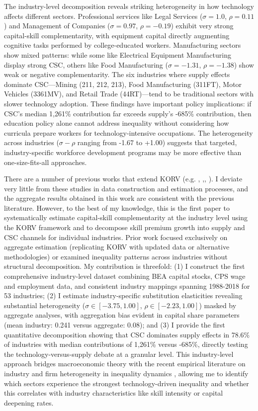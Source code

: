 \documentclass[12pt]{article}
\begin{document}
The industry-level decomposition reveals striking heterogeneity in how technology affects different sectors. Professional services like Legal Services ($\sigma = 1.0$, $\rho = 0.11$) and Management of Companies ($\sigma = 0.97$, $\rho = -0.19$) exhibit very strong capital-skill complementarity, with equipment capital directly augmenting cognitive tasks performed by college-educated workers. Manufacturing sectors show mixed patterns: while some like Electrical Equipment Manufacturing display strong CSC, others like Food Manufacturing ($\sigma = -1.31$, $\rho = -1.38$) show weak or negative complementarity. The six industries where supply effects dominate CSC---Mining (211, 212, 213), Food Manufacturing (311FT), Motor Vehicles (3361MV), and Retail Trade (44RT)---tend to be traditional sectors with slower technology adoption. These findings have important policy implications: if CSC's median 1,261\% contribution far exceeds supply's -685\% contribution, then education policy alone cannot address inequality without considering how curricula prepare workers for technology-intensive occupations. The heterogeneity across industries ($\sigma - \rho$ ranging from -1.67 to +1.00) suggests that targeted, industry-specific workforce development programs may be more effective than one-size-fits-all approaches.

There are a number of previous works that extend KORV (e.g. \citet{polgreen2008capital}, \citet{maliar2020capital},\citet{ohanian2021revisiting}, \citet{castex2022decline}). I deviate very little from these studies in data construction and estimation processes, and the aggregate results obtained in this work are consistent with the previous literature. However, to the best of my knowledge, this is the first paper to systematically estimate capital-skill complementarity at the industry level using the KORV framework and to decompose skill premium growth into supply and CSC channels for individual industries. Prior work focused exclusively on aggregate estimation (replicating KORV with updated data or alternative methodologies) or examined inequality patterns across industries without structural decomposition. My contribution is threefold: (1) I construct the first comprehensive industry-level dataset combining BEA capital stocks, CPS wage and employment data, and consistent industry mappings spanning 1988-2018 for 53 industries; (2) I estimate industry-specific substitution elasticities revealing substantial heterogeneity ($\sigma \in [-3.75, 1.00]$, $\rho \in [-2.23, 1.00]$) masked by aggregate analyses, with aggregation bias evident in capital share parameters (mean industry: 0.241 versus aggregate: 0.08); and (3) I provide the first quantitative decomposition showing that CSC dominates supply effects in 78.6\% of industries with median contributions of 1,261\% versus -685\%, directly testing the technology-versus-supply debate at a granular level. This industry-level approach bridges macroeconomic theory with the recent empirical literature on industry and firm heterogeneity in inequality dynamics \citep{haltiwanger2022industries, song2019firming}, allowing me to identify which sectors experience the strongest technology-driven inequality and whether this correlates with industry characteristics like skill intensity or capital deepening rates.
\end{document}
